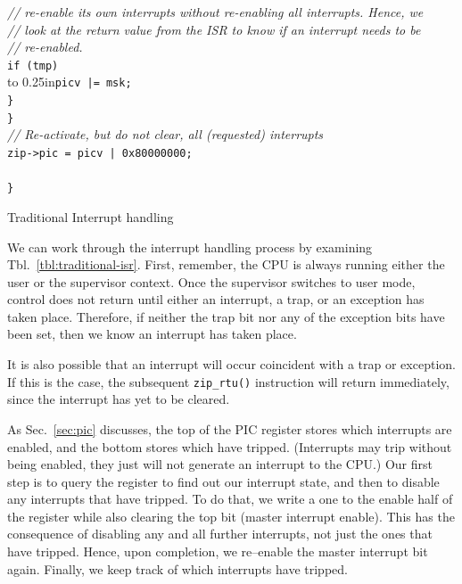 \documentclass{gqtekspec}
\begin{document}
\begin{table}
\begin{center}
\begin{tabbing}
	\>\>\>\>	{\em // re-enable its own interrupts without re-enabling all interrupts.  Hence, we}\\
	\>\>\>\>	{\em // look at the return value from the ISR to know if an interrupt needs to be }\\
	\> \>\>\>	{\em // re-enabled. }\\
	\> \>\>\>	{\tt if (tmp)} \\
	\> \>\>\>	\hbox to 0.25in{}\={\tt picv |= msk; }\\
	\> \>\>		{\tt \} }\\
	\> \>	{\tt \} }\\
	\> \>	{\em // Re-activate, but do not clear, all (requested) interrupts }\\
	\> \>	{\tt zip->pic = picv | 0x80000000; }\\
	\>{\tt \} }\\
{\tt \}}\\
\end{tabbing}
\caption{Traditional Interrupt handling}\label{tbl:traditional-isr}
\end{center}\end{table}

We can work through the interrupt handling process by examining
Tbl.~\ref{tbl:traditional-isr}.  First, remember, the CPU is always running
either the user or the supervisor context.  Once the supervisor switches to
user mode, control does not return until either an interrupt, a trap, or an
exception has taken place.  Therefore, if neither the trap bit nor any of the
exception bits have been set, then we know an interrupt has taken place.

It is also possible that an interrupt will occur coincident with a trap or
exception.  If this is the case, the subsequent {\tt zip\_rtu()} instruction
will return immediately, since the interrupt has yet to be cleared.

As Sec.~\ref{sec:pic} discusses, the top of the PIC register stores which 
interrupts are enabled, and the bottom stores which have tripped.  (Interrupts
may trip without being enabled, they just will not generate an interrupt to the
CPU.)  Our first step is to query the register to find out our interrupt
state, and then to disable any interrupts that have tripped.  To do
that, we write a one to the enable half of the register while also clearing
the top bit (master interrupt enable).  This has the consequence of disabling
any and all further interrupts, not just the ones that have tripped.  Hence,
upon completion, we re--enable the master interrupt bit again.   Finally,
we keep track of which interrupts have tripped.
\end{document}
